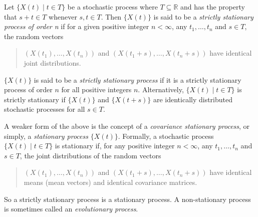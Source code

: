 \documentclass[12pt]{article}
\begin{document}
Let $\lbrace X(t)\mid t\in T\rbrace$ be a stochastic process where
$T\subseteq\mathbb{R}$ and has the property that $s+t\in T$ whenever
$s,t\in T$.  Then $\lbrace X(t)\rbrace$ is said to be a
\emph{strictly stationary process of order n} if for a given
positive integer $n<\infty$, any $t_1,\ldots,t_n$ and $s\in T$, the
random vectors 
\begin{quote}
$(X(t_1),\ldots,X(t_n))$ and $(X(t_1+s),\ldots,X(t_n+s))$ have identical joint distributions.
\end{quote}
$\lbrace X(t) \rbrace$ is said to be a \emph{strictly stationary
process} if it is a strictly stationary process of order $n$ for all
positive integers $n$.  Alternatively, $\lbrace X(t)\mid t\in
T\rbrace$ is strictly stationary if $\lbrace X(t)\rbrace$ and
$\lbrace X(t+s)\rbrace$ are identically distributed stochastic
processes for all $s\in T$.

A weaker form of the above is the concept of a \emph{covariance
stationary process}, or simply, a \emph{stationary process} $\lbrace
X(t)\rbrace$.  Formally, a stochastic process $\lbrace X(t)\mid t\in
T\rbrace$ is stationary if, for any positive integer $n<\infty$, any
$t_1,\ldots,t_n$ and $s\in T$, the joint distributions of the random
vectors 
\begin{quote}
$(X(t_1),\ldots,X(t_n))$ and $(X(t_1+s),\ldots,X(t_n+s))$
have identical means (mean vectors) and identical covariance matrices.  
\end{quote}
So a strictly stationary process is a stationary process.  A non-stationary process is sometimes called an \emph{evolutionary process}.
\end{document}
